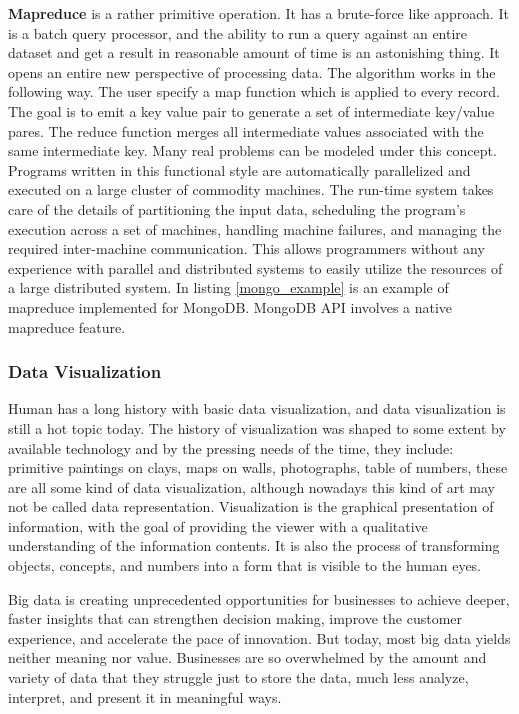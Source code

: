 \textbf{Mapreduce} is a rather primitive operation. It has a brute-force like approach. It is a batch query processor, and the ability to run a query against an entire dataset and get a result in reasonable amount of time is an astonishing thing. It opens an entire new perspective of processing data. The algorithm works in the following way. The user specify a map function which is applied to every record. The goal is to emit a key value pair to generate a set of intermediate key/value pares. The reduce function merges all intermediate values associated with the same intermediate key. Many real problems can be modeled under this concept. Programs written in this functional style are automatically parallelized and executed on a large cluster of commodity machines. The run-time system takes care of the details of partitioning the input data, scheduling the program's execution across a set of machines, handling machine failures, and managing the required inter-machine communication. This allows programmers without any experience with parallel and distributed systems to easily utilize the resources of a large distributed system. In listing \ref{mongo_example} is an example of mapreduce implemented for MongoDB. MongoDB API involves a native mapreduce feature.



\subsubsection{Data Visualization}
Human has a long history with basic data visualization, and data visualization is still a hot topic today. The history of visualization was shaped to some extent by available technology and by the pressing needs of the time, they include: primitive paintings on clays, maps on walls, photographs, table of numbers, these are all some kind of data visualization, although nowadays this kind of art may not be called data representation. Visualization is the graphical presentation of information, with the goal of providing the viewer with a qualitative understanding of the information contents. It is also the process of transforming objects, concepts, and numbers into a form that is visible to the human eyes.

Big data is creating unprecedented opportunities for businesses to achieve deeper, faster insights that can strengthen decision making, improve the customer experience, and accelerate the pace of innovation. But today, most big data yields neither meaning nor value. Businesses are so overwhelmed by the amount and variety of data that they struggle just to store the data, much less analyze, interpret, and present it in meaningful ways.

